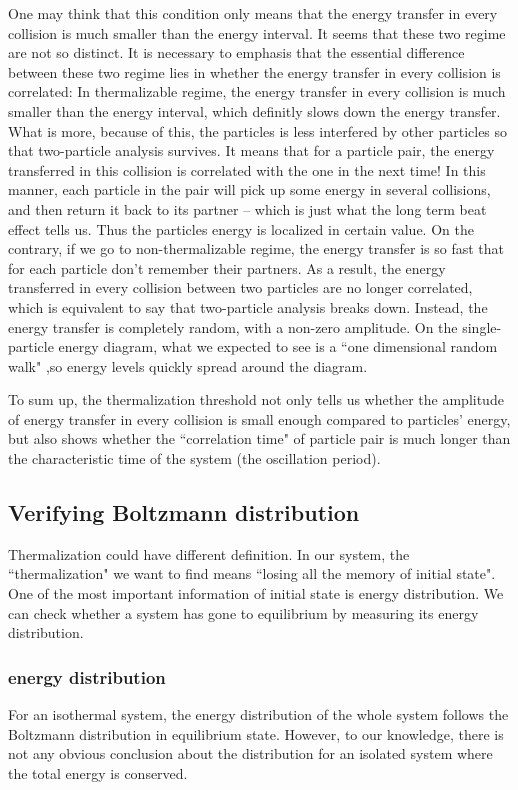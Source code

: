 \documentclass[aps,pre,twocolumn
,groupedaddress]{revtex4-1}
\begin{document}
One may think that this condition only means that the energy transfer in every collision is much smaller than the energy interval. It seems that these two regime are not so distinct. It is necessary to emphasis that the essential difference between these two regime lies in whether the energy transfer in every collision is correlated: In thermalizable regime, the energy transfer in every collision is much smaller than the energy interval, which definitly slows down the energy transfer. What is more, because of this, the particles is less interfered by other particles so that two-particle analysis survives. It means that for a particle pair, the energy transferred in this collision is correlated with the one in the next time! In this manner, each particle in the pair will pick up some energy in several collisions, and then return it back to its partner -- which is just what the long term beat effect tells us. Thus the particles energy is localized in certain value. On the contrary, if we go to non-thermalizable regime, the energy transfer is so fast that for each particle don't remember their partners. As a result, the energy transferred in every collision between two particles are no longer correlated, which is equivalent to say that two-particle analysis breaks down. Instead, the energy transfer is completely random, with a non-zero amplitude. On the single-particle energy diagram, what we expected to see is a ``one dimensional random walk" ,so energy levels quickly spread around the diagram.

To sum up, the thermalization threshold not only tells us whether the amplitude of energy transfer in every collision is small enough compared to particles' energy, but also shows whether the ``correlation time" of particle pair is much longer than the characteristic time of the system (the oscillation period).  




\newpage
\subsection{Verifying Boltzmann distribution}
Thermalization could have different definition. In our system, the ``thermalization" we want to find means ``losing all the memory of initial state". One of the most important information of initial state is energy distribution. We can check whether a system has gone to equilibrium by measuring its energy distribution.

 
\subsubsection{energy distribution}
For an isothermal system, the energy distribution of the whole system follows the Boltzmann distribution in equilibrium state. However, to our knowledge, there is not any obvious conclusion about the distribution for an isolated system where the total energy is conserved.
\end{document}
